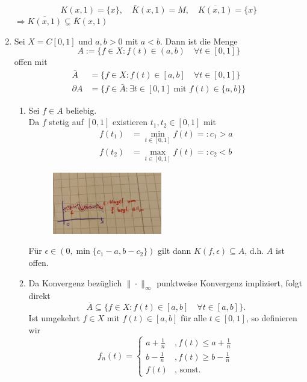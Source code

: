 \begin{beispiel}
\begin{enumerate}[label=\alph*\upshape)]
			\[ K(x, 1) = \{ x \}, \quad \bar K(x, 1) = M, \quad \overline{K(x, 1)} = \{ x \} \]
			$\Rightarrow \overline{K(x, 1)} \subsetneq \bar K(x, 1)$
		\item \label{bsp:1-4.11.b} Sei $X = C[0, 1]$ und $a, b > 0$ mit $a < b$. Dann ist die Menge
			\[ A := \{ f \in X: f(t) \in (a, b) \quad \forall t \in [0, 1] \} \]
			offen mit
			\begin{align*}
				\bar A & = \{ f \in X: f(t) \in [a, b] \quad \forall t \in [0, 1] \} \\
				\partial A & = \{ f \in \bar A: \exists t \in [0, 1] \text{ mit } f(t) \in \{ a, b \} \}
			\end{align*}
			\begin{beweis}
				\begin{enumerate} 
 					\item Sei $f \in A$ beliebig. \\ 		
						Da $f$ stetig auf $[0, 1]$ existieren $t_{1}, t_{2} \in [0, 1]$ mit
						\begin{align*}
							f(t_{1}) & = \min_{t \in [0, 1]} f(t) =: c_{1} > a \\
							f(t_{2}) & = \max_{t \in [0, 1]} f(t) =: c_{2} < b
						\end{align*}
						\begin{figure}[h]
  							\begin{center}
   								\includegraphics[width=0.48\textwidth]{images/bsp-4.11.c.i}					
  							\end{center}
						\end{figure}					
						Für $\epsilon \in (0, \min\{c_1 - a, b - c_2\})$ gilt dann $K(f, \epsilon) \subseteq A$, d.h. $A$ ist offen.
					\item Da Konvergenz bezüglich $\| \cdot \|_{\infty}$ punktweise Konvergenz impliziert, folgt direkt
						\[ \overline{A} \subseteq \{ f\in X \colon f(t) \in [a, b] \quad \forall t \in [a,b] \}. \]
						Ist umgekehrt $f \in X$ mit $f(t) \in [a, b]$ für alle $t \in [0,1]$, so definieren wir
						\[ f_{n}(t) = \begin{cases} a + \frac{1}{n} &, f(t) \leq a + \frac{1}{n} \\ b - \frac{1}{n} &, f(t) \geq b - \frac{1}{n} \\ f(t) &, \text{ sonst.}  \end{cases}   \]

\end{enumerate}
\end{beweis}
\end{enumerate}
\end{beispiel}
